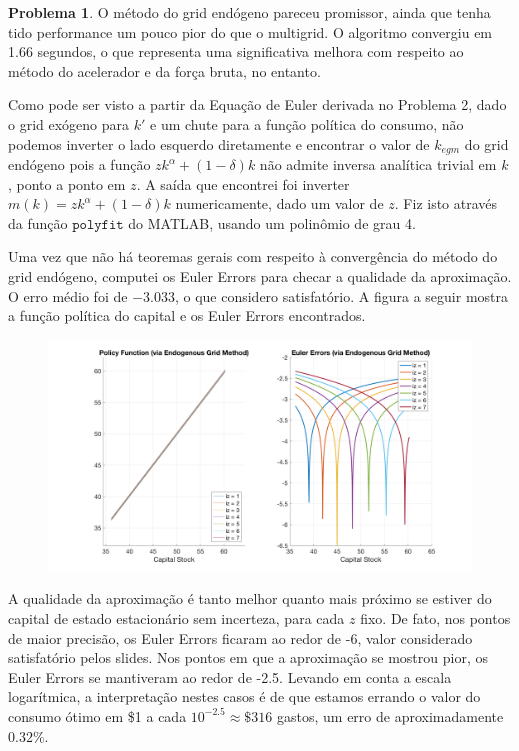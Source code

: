 \documentclass[11pt]{article}
\theoremstyle{definition}
\theoremstyle{definition}
\newtheorem{problema}{Problema}
\theoremstyle{solution}
\begin{document}
\begin{problema}
	O método do grid endógeno pareceu promissor, ainda que tenha tido performance um pouco pior do que o multigrid. O algoritmo convergiu em 1.66 segundos, o que representa uma significativa melhora com respeito ao método do acelerador e da força bruta, no entanto.
	
	Como pode ser visto a partir da Equação de Euler derivada no Problema 2, dado o grid exógeno para $k'$ e um chute para a função política do consumo, não podemos inverter o lado esquerdo diretamente e encontrar o valor de $k_{egm}$ do grid endógeno pois a função $zk^{\alpha} + (1-\delta)k$ não admite inversa analítica trivial em $k$, ponto a ponto em $z$. A saída que encontrei foi inverter $m(k) =  zk^{\alpha} + (1-\delta)k$ numericamente, dado um valor de $z$. Fiz isto através da função $\texttt{polyfit}$ do MATLAB, usando um polinômio de grau 4.
	
	Uma vez que não há teoremas gerais com respeito à convergência do método do grid endógeno, computei os Euler Errors para checar a qualidade da aproximação. O erro médio foi de $-3.033$, o que considero satisfatório. A figura a seguir mostra a função política do capital e os Euler Errors encontrados.
	\begin{figure}
		\centering
		\includegraphics[scale = 0.33]{EE.png}
	\end{figure}
	
	A qualidade da aproximação é tanto melhor quanto mais próximo se estiver do capital de estado estacionário sem incerteza, para cada $z$ fixo. De fato, nos pontos de maior precisão, os Euler Errors ficaram ao redor de -6, valor considerado satisfatório pelos slides. Nos pontos em que a aproximação se mostrou pior, os Euler Errors se mantiveram ao redor de -2.5. Levando em conta a escala logarítmica, a interpretação nestes casos é de que estamos errando o valor do consumo ótimo em \$1 a cada $10^{-2.5} \approx \$ 316$ gastos, um erro de aproximadamente $0.32\%$. 
\end{problema}
\end{document}
